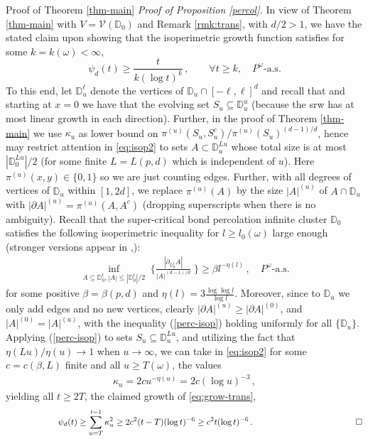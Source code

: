 \documentclass[12pt,reqno]{amsart}
\numberwithin{equation}{section}
\theoremstyle{definition}
\begin{document}
\begin{section}{Proof of Theorem \ref{thm-main}}
\medskip
\noindent
{\emph{Proof of Proposition \ref{percol}.} } 
In view of Theorem \ref{thm-main} 
with $V=\mathcal{V}({\mathbb{D}}_0)$
 and Remark \ref{rmk:trans}, with $d/2>1$,
we have the stated claim upon showing that the 
isoperimetric growth function satisfies for some $k =k(\omega) <\infty$,
\begin{equation}\label{eq:grow-trans}
\psi_d(t) \ge \frac{t}{k (\log t)^k} \,, \qquad \forall t \ge k, {{\quad P^\omega\text{-a.s.}}} 
\end{equation}
To this end, let ${\mathbb{D}}_u^{\ell}$ denote the vertices of  
${\mathbb{D}}_u \cap [-\ell,\ell]^d$ and recall that 
and starting at $x=0$ we have that the evolving set
$S_u \subseteq {\mathbb{D}}_u^u$ (because the {{\sc\lowercase{{srw}}}}
has at most linear growth in each direction).
Further, in the proof of Theorem \ref{thm-main} 
we use $\kappa_u$ as lower bound on 
$\pi^{(u)}(S_u,S_u^c)/\pi^{(u)}(S_u)^{(d-1)/d}$,
hence may restrict attention in \eqref{eq:isop2} to sets
$A \subset {\mathbb{D}}_u^{Lu}$ whose total size is at
most $|{\mathbb{D}}^{Lu}_0|/2$ (for some finite $L=L(p,d)$ 
which is independent of $u$).
Here $\pi^{(u)}(x,y) \in \{0,1\}$ so we are just counting edges. Further,
with all degrees of vertices of ${\mathbb{D}}_u$ within $[1,2d]$, we replace
$\pi^{(u)}(A)$ by the size $|A|^{(u)}$ of $A \cap {\mathbb{D}}_u$ with 
$|\partial A|^{(u)}=\pi^{(u)}(A,A^c)$ (dropping superscripts 
when there is no ambiguity). Recall \cite[p.102]{MR} that the 
super-critical bond percolation infinite cluster ${\mathbb{D}}_0$
satisfies the following isoperimetric inequality for 
$l \ge l_0(\omega)$ large enough (stronger versions appear in \cite{Ba},\cite{Pe}):
\begin{align}
\inf_{A\subseteq {\mathbb{D}}_0^l, |A|\le|{\mathbb{D}}_0^l|/2}
\; \Big\{ \frac{|\partial_{{\mathbb{D}}_0^l}A|}{|A|^{(d-1)/d}} \; \Big\} 
\ge \beta l^{-\eta(l)}\,, {{\quad P^\omega\text{-a.s.}}}
\label{perc-isop}
\end{align}
for some positive $\beta=\beta(p,d)$ and 
$\eta(l)
= 3 \frac{\log \log l}{\log l}$.
Moreover, since to ${\mathbb{D}}_u$ we only add edges and no new vertices, clearly 
$|\partial A|^{(u)}\ge|\partial A|^{(0)}$, and $|A|^{(0)} = |A|^{(u)}$, with  
the inequality (\ref{perc-isop}) holding uniformly for all $\{{\mathbb{D}}_u\}$. 
Applying (\ref{perc-isop}) to sets $S_u\subseteq {\mathbb{D}}_u^{Lu}$, and utilizing
the fact that $\eta(Lu)/\eta(u) \to 1$ when $u \to \infty$, we can take 
in \eqref{eq:isop2} for some $c=c(\beta,L)$ 
finite and all $u \ge T{{(\omega)}}$, 
the values 
\begin{align*}
\kappa_u = 2 c u^{-\eta(u)} = 2 c (\log u)^{-3}\,,
\end{align*}
yielding all $t \ge 2 T$, the claimed growth of \eqref{eq:grow-trans},
\begin{equation*}
\qquad\qquad\qquad
\psi_d(t) \ge \sum_{u=T}^{t-1} \kappa_u^2 \ge 2 c^2 (t-T) (\log t)^{-6}
\ge c^2 t (\log t)^{-6} \,.
\qquad\qquad\qquad\qquad\qquad{\qed}
\end{equation*}


\end{section}
\end{document}
